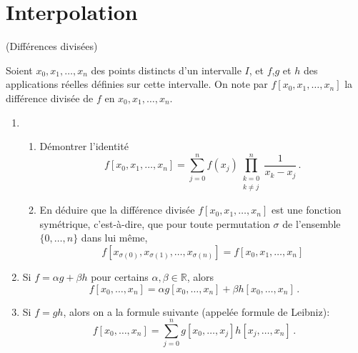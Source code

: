 \documentclass[a4paper,12pt,reqno]{amsart}
\begin{document}

\section{Interpolation}


\begin{exo} (Différences divisées)

Soient $x_0,x_1,\ldots,x_n$ des points distincts d'un intervalle $I$, et $f$,$g$ et $h$ des applications réelles définies sur cette intervalle. On note par $f[x_{0},x_{1},\ldots,x_{n}]$ la différence divisée de $f$ en $x_0,x_1,\ldots,x_n$.
  \begin{enumerate}
    \item
      \begin{enumerate}
        \item Démontrer l'identité
          $$
            f[x_{0},x_{1},\ldots,x_{n}] =
              \sum_{j=0}^{n} f(x_{j}) \prod_{\substack{k=0 \\ k\neq j}}^{n}
                \frac{1}{x_{k} - x_{j}}\,.
          $$

        \item En déduire que la différence divisée $f[x_{0},x_{1},\ldots,x_{n}]$ est une fonction symétrique, c'est-à-dire, que pour toute permutation $\sigma$ de l'ensemble $\{0,\ldots,n\}$ dans lui même,
          $$
            f[x_{\sigma(0)},x_{\sigma(1)},\ldots,x_{\sigma(n)}] = f[x_{0},x_{1},\ldots,x_{n}]
          $$
      \end{enumerate}

    \item Si $f = \alpha g + \beta h$ pour certains $\alpha ,\beta \in \mathbb{R}$, alors
      $$
        f[x_{0},\ldots,x_{n}] = \alpha g[x_{0},\ldots,x_{n}] + \beta h[x_{0},\ldots,x_{n}]\,.
      $$

    \item Si $f = gh$, alors on a la formule suivante (appelée formule de Leibniz):
      $$
        f[x_{0},\ldots,x_{n}] = \sum_{j=0}^{n} g[x_{0},\ldots,x_{j}]h[x_{j},\ldots,x_{n}]\,.
      $$
  \end{enumerate}
\end{exo}
\end{document}

